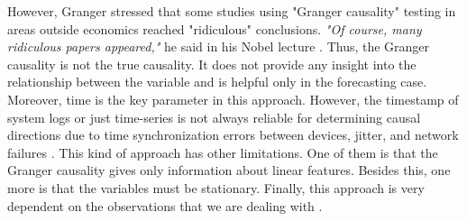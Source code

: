 However, Granger stressed that some studies using "Granger causality" testing in areas outside economics reached "ridiculous" conclusions. \textit{"Of course, many ridiculous papers appeared,"} he said in his Nobel lecture \cite{granger2004nobel}. Thus, the Granger causality is not the true causality. It does not provide any insight into the relationship between the variable and is helpful only in the forecasting case. Moreover, time is the key parameter in this approach. However, the timestamp of system logs or just time-series is not always reliable for determining causal directions due to time synchronization errors between devices, jitter, and network failures \cite{kobayashi2017mining}. This kind of approach has other limitations. One of them is that the Granger causality gives only information about linear features. Besides this, one more is that the variables must be stationary. Finally, this approach is very dependent on the observations that we are dealing with \cite{seth2007granger}.
